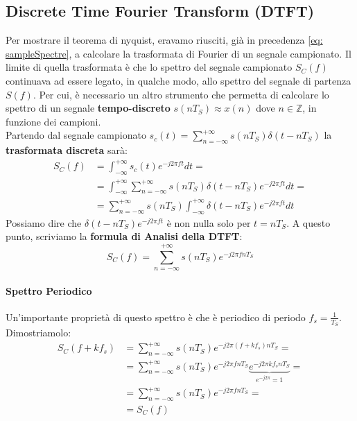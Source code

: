 \newcommand{\DFT}{\xrightarrow{\text{DFT}}}
\newcommand{\IDFT}{\xrightarrow{\text{DFT}^{-1}}}

\subsection{Discrete Time Fourier Transform (DTFT)}
Per mostrare il teorema di nyquist, eravamo riusciti, già in precedenza \eqref{eq: sampleSpectre}, a calcolare la trasformata di Fourier
di un segnale campionato. Il limite di quella trasformata è che lo spettro del segnale campionato $S_C(f)$ continuava ad essere
legato, in qualche modo, allo spettro del segnale di partenza $S(f)$. Per cui, è necessario un altro strumento che permetta di
calcolare lo spettro di un segnale \textbf{tempo-discreto} $s(nT_S) \approx x(n)$ dove $n \in \mathbb{Z}$, in funzione dei campioni.\\
Partendo dal segnale campionato $s_c(t) = \sum_{n = -\infty}^{+\infty} s(nT_S)\delta(t - nT_S)$ la \textbf{trasformata discreta} sarà:
\begin{align*}
    S_C(f) &= \int_{-\infty}^{+\infty}s_c(t)e^{-j2\pi ft}dt =\\
           &= \int_{-\infty}^{+\infty} \sum_{n = -\infty}^{+\infty} s(nT_S)\delta(t - nT_S) e^{-j2\pi ft}dt=\\
           &= \sum_{n = -\infty}^{+\infty} s(nT_S) \int_{-\infty}^{+\infty} \delta(t - nT_S) e^{-j2\pi ft}dt
\end{align*}
Possiamo dire che $\delta(t - nT_S) e^{-j2\pi ft}$ è non nulla solo per $t = nT_S$.
A questo punto, scriviamo la \textbf{formula di Analisi della DTFT}:
\begin{equation}
    S_C(f) = \sum_{n = -\infty}^{+\infty} s(nT_S) e^{-j2\pi fnT_S}
\end{equation}
\paragraph{Spettro Periodico}Un'importante proprietà di questo spettro è che è periodico di periodo $f_s = \frac{1}{T_S}$. Dimostriamolo:
\begin{align*}
    S_C(f + kf_s) &= \sum_{n = -\infty}^{+\infty} s(nT_S) e^{-j2\pi (f + kf_s)nT_S} = \\
                  &= \sum_{n = -\infty}^{+\infty} s(nT_S) e^{-j2\pi fnT_S}  \underbrace{e^{-j2\pi kf_s nT_S}}_{e^{-j2\pi} = 1} =\\
                  &= \sum_{n = -\infty}^{+\infty} s(nT_S) e^{-j2\pi fnT_S} =\\
                  &= S_C(f)
\end{align*}

